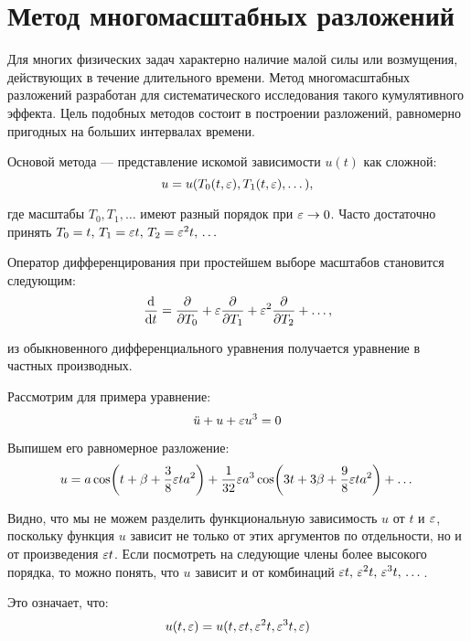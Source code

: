 \chapter*{Метод многомасштабных разложений}

Для многих физических задач характерно
наличие малой силы или возмущения,
действующих в течение длительного времени.
Метод многомасштабных разложений разработан
для систематического исследования
такого кумулятивного эффекта.
Цель подобных методов состоит
в построении разложений,
равномерно пригодных на больших интервалах времени.
\cite{coul1972}

Основой метода --- представление
искомой зависимости $u(t)$ как сложной:
\begin{equation*}
    u = u(T_0(t, \varepsilon), T_1(t, \varepsilon), \dots),
\end{equation*}

где масштабы $T_0, T_1, \dots$
имеют разный порядок при $\varepsilon \to 0$.
Часто достаточно принять
$T_0 = t, \, T_1 = \varepsilon t, \, T_2 = \varepsilon^2 t, \, \dots$

Оператор дифференцирования при простейшем выборе масштабов
становится следующим:
\begin{equation*}
    \dv{}{t} = \pdv{}{T_0} + \varepsilon \pdv{}{T_1} +
    \varepsilon^2 \pdv{}{T_2} + \dots,
\end{equation*}

из обыкновенного дифференциального уравнения
получается уравнение в частных производных.

Рассмотрим для примера уравнение:
\begin{equation*}
    \ddot{u} + u + \varepsilon u^3 = 0
\end{equation*}

Выпишем его равномерное разложение:
\begin{equation*}
    u = a \cos(t + \beta + \frac{3}{8} \varepsilon t a^2) +
    \frac{1}{32} \varepsilon a^3
    \cos(3 t + 3 \beta + \frac{9}{8} \varepsilon t a^2) + \dots
\end{equation*}

Видно, что мы не можем разделить
функциональную зависимость $u$ от $t$ и $\varepsilon$,
поскольку функция $u$ зависит не только от этих аргументов
по отдельности, но и от произведения $\varepsilon t$.
Если посмотреть на следующие члены более высокого порядка,
то можно понять, что $u$ зависит и от комбинаций
$\varepsilon t, \, \varepsilon^2 t, \, \varepsilon^3 t, \, \dots$.

Это означает, что:
\begin{equation*}
    u(t, \varepsilon) = u(t, \varepsilon t, \varepsilon^2 t, \varepsilon^3 t, \varepsilon) 
\end{equation*}

